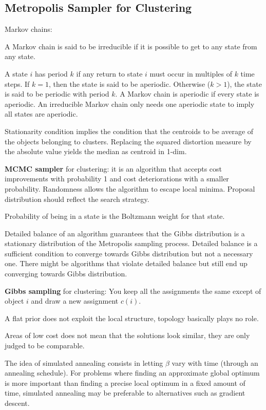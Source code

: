 \documentclass[12pt]{article}
\begin{document}
\subsection{Metropolis Sampler for Clustering}
\par Markov chains:
\ulb
\item A Markov chain is said to be irreducible if it is possible to get to any state from any state.
\item A state $i$ has period $k$ if any return to state $i$ must occur in multiples of $k$ time steps. If $k = 1$, then the state is said to be aperiodic. Otherwise ($k > 1$), the state is said to be periodic with period $k$. A Markov chain is aperiodic if every state is aperiodic. An irreducible Markov chain only needs one aperiodic state to imply all states are aperiodic.
\ule
\par Stationarity condition implies the condition that the centroids to be average of the objects belonging to clusters. Replacing the squared distortion measure by the absolute value yields the median as centroid in 1-dim.
\par  \textbf{MCMC sampler} for clustering: it is an algorithm that accepts cost improvements with probability 1 and cost deteriorations with a smaller probability. Randomness allows the algorithm to escape local minima. Proposal distribution should reflect the search strategy.
\par Probability of being in a state is the Boltzmann weight for that state.
\par Detailed balance of an algorithm guarantees that the Gibbs distribution is a stationary distribution of the Metropolis sampling process. Detailed balance is a sufficient condition to converge towards Gibbs distribution but not a necessary one. There might be algorithms that violate detailed balance but still end up converging towards Gibbs distribution.
\par \textbf{Gibbs sampling} for clustering: You keep all the assignments the same except of object $i$ and draw a new assignment $c(i)$.
\par A flat prior does not exploit the local structure, topology basically plays no role.
\par Areas of low cost does not mean that the solutions look similar, they are only judged to be comparable.
\par The idea of simulated annealing consists in letting $\beta$ vary with time (through an annealing schedule). For problems where finding an approximate global optimum is more important than finding a precise local optimum in a fixed amount of time, simulated annealing may be preferable to alternatives such as gradient descent.
\end{document}
